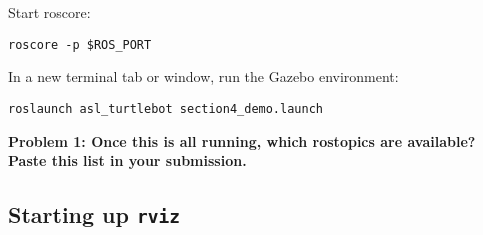 \documentclass{article}
\begin{document}



Start roscore:
\begin{lstlisting}
roscore -p $ROS_PORT
\end{lstlisting}

In a new terminal tab or window, run the Gazebo environment:
\begin{lstlisting}
roslaunch asl_turtlebot section4_demo.launch
\end{lstlisting}

{\bf Problem 1: Once this is all running, which rostopics are available? Paste this list in your submission.}

\subsection{Starting up \texttt{rviz}}



\end{document}
